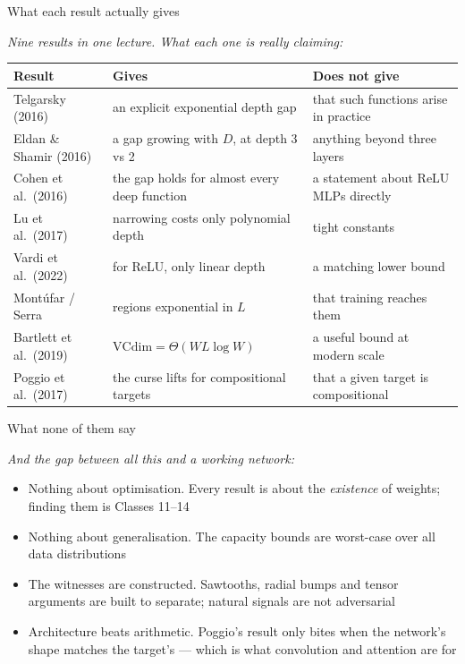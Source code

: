 \documentclass[aspectratio=169, 11pt]{beamer}
\newcommand{\bridge}[1]{%
  {\scriptsize\itshape\color{mcMuted} #1\par}\vspace{0.35em}}
\newcommand{\nosrc}{}       %
\begin{document}
\begin{frame}{What each result actually gives}
  \nosrc
  \bridge{Nine results in one lecture. What each one is really
  claiming:}
  \vspace{-0.05em}
  \centering
  \renewcommand{\arraystretch}{1.2}
  {\scriptsize
  \begin{tabular}{p{} p{}
                  p{}}
    \textbf{Result} & \textbf{Gives} & \textbf{Does not give}\\
    \hline
    Telgarsky (2016)
      & an explicit exponential depth gap
      & that such functions arise in practice\\
    Eldan \& Shamir (2016)
      & a gap growing with $D$, at depth 3 vs 2
      & anything beyond three layers\\
    Cohen et al.\ (2016)
      & the gap holds for almost every deep function
      & a statement about ReLU MLPs directly\\
    Lu et al.\ (2017)
      & narrowing costs only polynomial depth
      & tight constants\\
    Vardi et al.\ (2022)
      & for ReLU, only linear depth
      & a matching lower bound\\
    Mont\'ufar / Serra
      & regions exponential in $L$
      & that training reaches them\\
    Bartlett et al.\ (2019)
      & $\mathrm{VCdim}=\Theta(WL\log W)$
      & a useful bound at modern scale\\
    Poggio et al.\ (2017)
      & the curse lifts for compositional targets
      & that a given target is compositional\\
    \hline
  \end{tabular}}
\end{frame}

\begin{frame}{What none of them say}
  \nosrc
  \bridge{And the gap between all this and a working network:}
  \vspace{0.3em}
  \begin{itemize}\setlength{\itemsep}{5pt}
    \item \alert{Nothing about optimisation.} Every result is about the
          \emph{existence} of weights; finding them is Classes 11--14
    \item \alert{Nothing about generalisation.} The capacity bounds are
          worst-case over all data distributions
    \item \alert{The witnesses are constructed.} Sawtooths, radial
          bumps and tensor arguments are built to separate; natural
          signals are not adversarial
    \item \alert{Architecture beats arithmetic.} Poggio's result only
          bites when the network's shape matches the target's ---
          which is what convolution and attention are for
  \end{itemize}
\end{frame}
\end{document}
